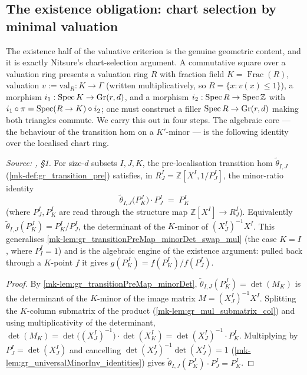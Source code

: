 \subsection*{The existence obligation: chart selection by minimal valuation}

The existence half of the valuative criterion is the genuine geometric content,
and it is exactly Nitsure's chart-selection argument. A commutative square over a
valuation ring presents a valuation ring \(R\) with fraction field \(K =
\operatorname{Frac}(R)\), valuation \(v := \mathrm{val}_R : K \to \Gamma\) (written
multiplicatively, so \(R = \{x : v(x) \le 1\}\)), a morphism \(i_1 : \operatorname{Spec} K \to
\mathrm{Gr}(r,d)\), and a morphism \(i_2 : \operatorname{Spec} R \to \operatorname{Spec} \mathbb{Z}\) with
\(i_1 \circ \pi = \operatorname{Spec}(R \to K) \circ i_2\); one must construct a filler
\(\operatorname{Spec} R \to \mathrm{Gr}(r,d)\) making both triangles commute. We carry this out
in four steps. The algebraic core --- the behaviour of the transition hom on a
\(K'\)-minor --- is the following identity over the localised chart ring.

\begin{lemma}\label{mk-lem:gr_transitionPreMap_minorDet_mul}
  \leanok

  \textit{Source: \cite{nitsure-hilbert-quot}, \S 1.}
  For size-\(d\) subsets \(I, J, K\), the pre-localisation transition hom
  \(\tilde\theta_{I,J}\) (\ref{mk-def:gr_transition_pre}) satisfies, in \(R^I_J =
  \mathbb{Z}[X^I, 1/P^I_J]\), the minor-ratio identity
  \[
    \tilde\theta_{I,J}\bigl(P^J_K\bigr)\cdot P^I_J \;=\; P^I_K
  \]
  (where \(P^I_J, P^I_K\) are read through the structure map \(\mathbb{Z}[X^I] \to
  R^I_J\)). Equivalently \(\tilde\theta_{I,J}(P^J_K) = P^I_K / P^I_J\), the
  determinant of the \(K\)-minor of \((X^I_J)^{-1} X^I\). This generalises
  \ref{mk-lem:gr_transitionPreMap_minorDet_swap_mul} (the case \(K = I\), where
  \(P^I_I = 1\)) and is the algebraic engine of the existence argument: pulled back
  through a \(K\)-point \(f\) it gives \(g(P^J_K) = f(P^I_K)/f(P^I_J)\).
\end{lemma}
\begin{proof}
  \leanok
    By \ref{mk-lem:gr_transitionPreMap_minorDet}, \(\tilde\theta_{I,J}(P^J_K) =
  \det(M_K)\) is the determinant of the \(K\)-minor of the image matrix \(M =
  (X^I_J)^{-1} X^I\). Splitting the \(K\)-column submatrix of the product
  (\ref{mk-lem:gr_mul_submatrix_col}) and using multiplicativity of the determinant,
  \(\det(M_K) = \det\bigl((X^I_J)^{-1}\bigr)\cdot \det(X^I_K) =
  \det(X^I_J)^{-1}\cdot P^I_K\). Multiplying by \(P^I_J = \det(X^I_J)\) and
  cancelling \(\det(X^I_J)^{-1}\det(X^I_J) = 1\)
  (\ref{mk-lem:gr_universalMinorInv_identities}) gives
  \(\tilde\theta_{I,J}(P^J_K)\cdot P^I_J = P^I_K\).
\end{proof}

